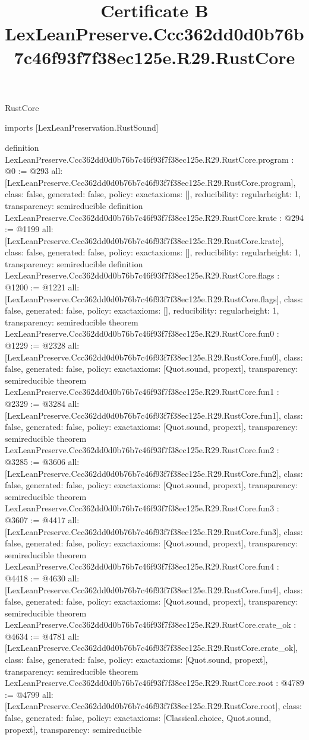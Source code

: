 \begin{lexlean}{RustCore}
\title{Certificate B LexLeanPreserve.Ccc362dd0d0b76b7c46f93f7f38ec125e.R29.RustCore}
\begin{coremodule}
imports [LexLeanPreservation.RustSound]

definition LexLeanPreserve.Ccc362dd0d0b76b7c46f93f7f38ec125e.R29.RustCore.program : @0 := @293 {
  all: [LexLeanPreserve.Ccc362dd0d0b76b7c46f93f7f38ec125e.R29.RustCore.program],
  class: false,
  generated: false,
  policy: exact{axioms: []},
  reducibility: regular{height: 1},
  transparency: semireducible
}
definition LexLeanPreserve.Ccc362dd0d0b76b7c46f93f7f38ec125e.R29.RustCore.krate : @294 := @1199 {
  all: [LexLeanPreserve.Ccc362dd0d0b76b7c46f93f7f38ec125e.R29.RustCore.krate],
  class: false,
  generated: false,
  policy: exact{axioms: []},
  reducibility: regular{height: 1},
  transparency: semireducible
}
definition LexLeanPreserve.Ccc362dd0d0b76b7c46f93f7f38ec125e.R29.RustCore.flags : @1200 := @1221 {
  all: [LexLeanPreserve.Ccc362dd0d0b76b7c46f93f7f38ec125e.R29.RustCore.flags],
  class: false,
  generated: false,
  policy: exact{axioms: []},
  reducibility: regular{height: 1},
  transparency: semireducible
}
theorem LexLeanPreserve.Ccc362dd0d0b76b7c46f93f7f38ec125e.R29.RustCore.fun0 : @1229 := @2328 {
  all: [LexLeanPreserve.Ccc362dd0d0b76b7c46f93f7f38ec125e.R29.RustCore.fun0],
  class: false,
  generated: false,
  policy: exact{axioms: [Quot.sound, propext]},
  transparency: semireducible
}
theorem LexLeanPreserve.Ccc362dd0d0b76b7c46f93f7f38ec125e.R29.RustCore.fun1 : @2329 := @3284 {
  all: [LexLeanPreserve.Ccc362dd0d0b76b7c46f93f7f38ec125e.R29.RustCore.fun1],
  class: false,
  generated: false,
  policy: exact{axioms: [Quot.sound, propext]},
  transparency: semireducible
}
theorem LexLeanPreserve.Ccc362dd0d0b76b7c46f93f7f38ec125e.R29.RustCore.fun2 : @3285 := @3606 {
  all: [LexLeanPreserve.Ccc362dd0d0b76b7c46f93f7f38ec125e.R29.RustCore.fun2],
  class: false,
  generated: false,
  policy: exact{axioms: [Quot.sound, propext]},
  transparency: semireducible
}
theorem LexLeanPreserve.Ccc362dd0d0b76b7c46f93f7f38ec125e.R29.RustCore.fun3 : @3607 := @4417 {
  all: [LexLeanPreserve.Ccc362dd0d0b76b7c46f93f7f38ec125e.R29.RustCore.fun3],
  class: false,
  generated: false,
  policy: exact{axioms: [Quot.sound, propext]},
  transparency: semireducible
}
theorem LexLeanPreserve.Ccc362dd0d0b76b7c46f93f7f38ec125e.R29.RustCore.fun4 : @4418 := @4630 {
  all: [LexLeanPreserve.Ccc362dd0d0b76b7c46f93f7f38ec125e.R29.RustCore.fun4],
  class: false,
  generated: false,
  policy: exact{axioms: [Quot.sound, propext]},
  transparency: semireducible
}
theorem LexLeanPreserve.Ccc362dd0d0b76b7c46f93f7f38ec125e.R29.RustCore.crate_ok : @4634 := @4781 {
  all: [LexLeanPreserve.Ccc362dd0d0b76b7c46f93f7f38ec125e.R29.RustCore.crate_ok],
  class: false,
  generated: false,
  policy: exact{axioms: [Quot.sound, propext]},
  transparency: semireducible
}
theorem LexLeanPreserve.Ccc362dd0d0b76b7c46f93f7f38ec125e.R29.RustCore.root : @4789 := @4799 {
  all: [LexLeanPreserve.Ccc362dd0d0b76b7c46f93f7f38ec125e.R29.RustCore.root],
  class: false,
  generated: false,
  policy: exact{axioms: [Classical.choice, Quot.sound, propext]},
  transparency: semireducible
}


\end{coremodule}
\end{lexlean}
